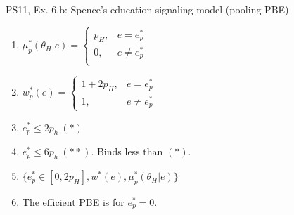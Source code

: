 \begin{frame}{PS11, Ex. 6.b: Spence’s education signaling model (pooling PBE)}
\begin{multicols}{2}
\begin{enumerate}
        \item $\mu_p^*(\theta_H|e)=\left\{\begin{array}{rl}
                  p_H, & e = e_p^* \\
                  0, & e \neq e_p^* \\
               \end{array}\right.$
        \item $w_p^*(e)=\left\{\begin{array}{rl}
                  1+2p_H, & e = e_p^* \\
                  1, & e \neq e_p^*
               \end{array}\right.$
        \item $e_p^*\leq2p_h\ (*)$
        \item $e_p^*\leq6p_h\ (**)$. Binds less than $(*)$.
        \item $\{e_p^*\in[0,2p_H],w^*(e),\mu_p^*(\theta_H|e)\}$
        \item The efficient PBE is for $e_p^*=0$.
      \end{enumerate}
    \end{multicols}
    \vfill\null
\end{frame}


